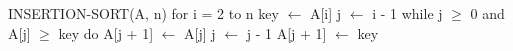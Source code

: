 \begin{pseudocode}[caption={Test.}, label={alg1}]
INSERTION-SORT(A, n)
    for i = 2 to n
        key $\gets$ A[i]
        j $\gets$ i - 1
        while j $\geq$ 0 and A[j] $\geq$ key do
            A[j + 1] $\gets$ A[j]
            j $\gets$ j - 1
        A[j + 1] $\gets$ key 
\end{pseudocode}